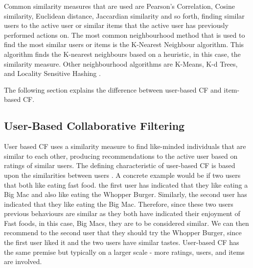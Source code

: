 Common similarity measures that are used are Pearson's Correlation, Cosine similarity, Euclidean distance, Jaccardian similarity and so forth, finding similar users to the active user or similar items that the active user has previously performed actions on. The most common neighbourhood method that is used to find the most similar users or items is the K-Nearest Neighbour algorithm. This algorithm finds the K-nearest neighbours based on a heuristic, in this case, the similarity measure. Other neighbourhood algorithms are K-Means, K-d Trees, and Locality Sensitive Hashing \cite{survey}. 


The following section explains the difference between user-based CF and item-based CF.




\subsection{User-Based Collaborative Filtering}

User based CF uses a similarity measure to find like-minded individuals that are similar to each other, producing recommendations to the active user based on ratings of similar users. The defining characteristic of user-based CF is based upon the similarities between users \cite{mahoutaction}. A concrete example would be if two users that both like eating fast food. the first user has indicated that they like eating a Big Mac and also like eating the Whopper Burger. Similarly, the second user has indicated that they like eating the Big Mac. Therefore, since these two users previous behaviours are similar as they both have indicated their enjoyment of Fast foods, in this case, Big Macs, they are to be considered similar. We can then recommend to the second user that they should try the Whopper Burger, since the first user liked it and the two users have similar tastes. User-based CF has the same premise but typically on a larger scale - more ratings, users, and items are involved. 


